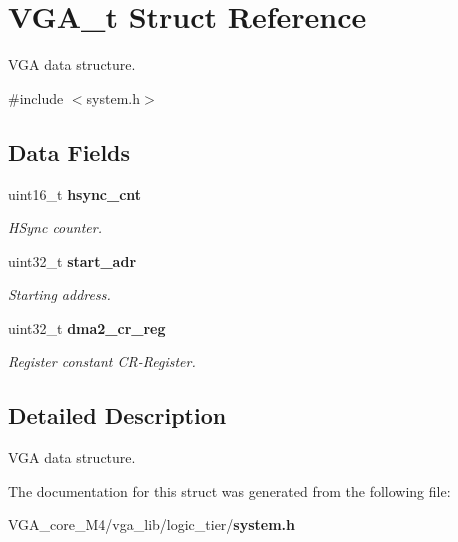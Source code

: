 \section{V\+G\+A\+\_\+t Struct Reference}
\label{struct_v_g_a__t}


V\+GA data structure.  




{\ttfamily \#include $<$system.\+h$>$}

\subsection*{Data Fields}
\begin{DoxyCompactItemize}
\item 
uint16\+\_\+t {\bf hsync\+\_\+cnt}\label{struct_v_g_a__t_a649bc185f93377aec7fa1c136dd2add0}

\begin{DoxyCompactList}\small\item\em H\+Sync counter. \end{DoxyCompactList}\item 
uint32\+\_\+t {\bf start\+\_\+adr}\label{struct_v_g_a__t_a7f47a855ae47844b419d75797f00fbbb}

\begin{DoxyCompactList}\small\item\em Starting address. \end{DoxyCompactList}\item 
uint32\+\_\+t {\bf dma2\+\_\+cr\+\_\+reg}\label{struct_v_g_a__t_a1fc3c1405cc22f5d4fc21eb58c47c06a}

\begin{DoxyCompactList}\small\item\em Register constant C\+R-\/\+Register. \end{DoxyCompactList}\end{DoxyCompactItemize}


\subsection{Detailed Description}
V\+GA data structure. 

The documentation for this struct was generated from the following file\+:\begin{DoxyCompactItemize}
\item 
V\+G\+A\+\_\+core\+\_\+\+M4/vga\+\_\+lib/logic\+\_\+tier/{\bf system.\+h}\end{DoxyCompactItemize}
